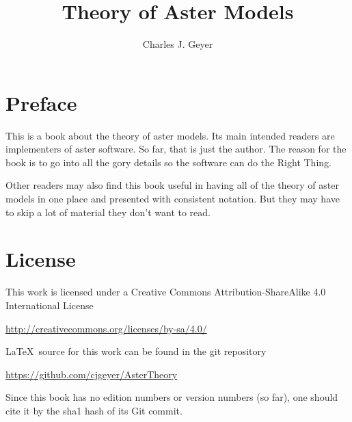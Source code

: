 \documentclass[11pt,oneside]{book}
\begin{document}
\title{Theory of Aster Models}

\author{Charles J. Geyer}

\maketitle

\frontmatter

\chapter{Preface}

This is a book about the theory of aster models.  Its main intended
readers are implementers of aster software.  So far, that is just the
author.  The reason for the book is to go into all the gory details
so the software can do the Right Thing.

Other readers may also find this book useful in having all of the theory
of aster models in one place and presented with consistent notation.
But they may have to skip a lot of material they don't want to read.

\chapter{License}

This work is licensed under a Creative Commons Attribution-ShareAlike 4.0
International License
\begin{trivlist}
\item
\url{http://creativecommons.org/licenses/by-sa/4.0/}
\end{trivlist}

\LaTeX\ source for this work can be found in the git repository
\begin{trivlist}
\item
\url{https://github.com/cjgeyer/AsterTheory}
\end{trivlist}

Since this book has no edition numbers or version numbers (so far),
one should cite it by the sha1 hash of its Git commit.

\tableofcontents

\mainmatter









\appendix













\printindex
\end{document}
